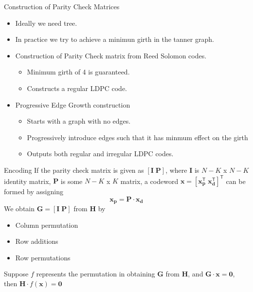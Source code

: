 \documentclass{beamer}
\begin{document}
 \begin{frame}{Construction of Parity Check Matrices}
  \begin{itemize}\itemsep 0.3cm
   \item Ideally we need tree.
   \item In practice we try to achieve a minimun girth in the tanner graph.
   \item Construction of Parity Check matrix from Reed Solomon codes.
   \begin{itemize}
    \item Minimum girth of 4 is guaranteed.
    \item Constructs a regular LDPC code.
   \end{itemize}
   \item Progressive Edge Growth construction
   \begin{itemize}
    \item Starts with a graph with no edges.
    \item Progressively introduce edges such that it has minmum effect on the girth
    \item Outputs both regular and irregular LDPC codes.
   \end{itemize}
  \end{itemize}
 \end{frame}
 
   \begin{frame}{Encoding}
   If the parity check matrix is given as $\mathbf{\left[{I \; P}\right]}$, where $\mathbf{I}$ is $N - K$ x $N - K$ identity matrix, $\mathbf{P}$ is some $N - K$ x $K$ matrix,
   a codeword $\mathbf{x = \left[x_p^{\mathsf{T}} \; x_d^{\mathsf{T}}\right]^{\mathsf{T}}}$ can be formed by assigning
    \begin{equation}\nonumber
    \mathbf{x_p = P \cdot x_d}
    \end{equation}
   We obtain $\mathbf{G = \left[{I \; P}\right]}$ from $\mathbf{H}$ by
   \begin{itemize}
    \item Column permutation
    \item Row additions
    \item Row permutations
   \end{itemize}
   Suppose $f$ represents the permutation in obtaining $\mathbf{G}$ from $\mathbf{H}$, and $\mathbf{G \cdot x = 0}$, then $\mathbf{H} \cdot f(\mathbf{x}) = \mathbf{0}$  
  \end{frame}
\end{document}
